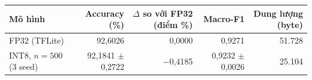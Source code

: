 \begin{tabular}{lrrrr}
\toprule
Mô hình & Accuracy (\%) & $\Delta$ so với FP32 (điểm \%) & Macro-F1 & Dung lượng (byte) \\
\midrule
FP32 (TFLite) & 92,6026 & 0,0000 & 0,9271 & 51.728 \\
INT8, $n=500$ (3 seed) & 92,1841 $\pm$ 0,2722 & $-$0,4185 & 0,9232 $\pm$ 0,0026 & 25.104 \\
\bottomrule
\end{tabular}
